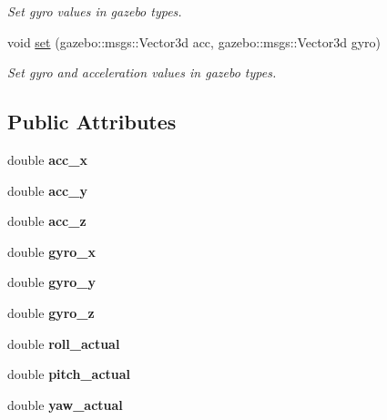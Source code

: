 \begin{DoxyCompactItemize}
\begin{DoxyCompactList}\small\item\em \-Set gyro values in gazebo types. \end{DoxyCompactList}\item 
\hypertarget{classIMU_a72be203017649a73245e1825bb0fa6a3}{void \hyperlink{classIMU_a72be203017649a73245e1825bb0fa6a3}{set} (gazebo\-::msgs\-::\-Vector3d acc, gazebo\-::msgs\-::\-Vector3d gyro)}\label{classIMU_a72be203017649a73245e1825bb0fa6a3}

\begin{DoxyCompactList}\small\item\em \-Set gyro and acceleration values in gazebo types. \end{DoxyCompactList}\end{DoxyCompactItemize}
\subsection*{\-Public \-Attributes}
\begin{DoxyCompactItemize}
\item 
\hypertarget{classIMU_a16bd4062efbff3e6e07f81491bdc3dc1}{double {\bfseries acc\-\_\-x}}\label{classIMU_a16bd4062efbff3e6e07f81491bdc3dc1}

\item 
\hypertarget{classIMU_aa5bde37d857dec28fcbe7544af9ec3e9}{double {\bfseries acc\-\_\-y}}\label{classIMU_aa5bde37d857dec28fcbe7544af9ec3e9}

\item 
\hypertarget{classIMU_a47bb386e4b6acc5600b3c03d0d130960}{double {\bfseries acc\-\_\-z}}\label{classIMU_a47bb386e4b6acc5600b3c03d0d130960}

\item 
\hypertarget{classIMU_a0a3f4e8e47e1047ec96fa558b83eb567}{double {\bfseries gyro\-\_\-x}}\label{classIMU_a0a3f4e8e47e1047ec96fa558b83eb567}

\item 
\hypertarget{classIMU_a40c3a9e20d6aa8c72df86a5bb3592060}{double {\bfseries gyro\-\_\-y}}\label{classIMU_a40c3a9e20d6aa8c72df86a5bb3592060}

\item 
\hypertarget{classIMU_a9bb72ce07f2318bbb93603c9fa2729fd}{double {\bfseries gyro\-\_\-z}}\label{classIMU_a9bb72ce07f2318bbb93603c9fa2729fd}

\item 
\hypertarget{classIMU_a515105cde25acc79d21ac892489a0f9e}{double {\bfseries roll\-\_\-actual}}\label{classIMU_a515105cde25acc79d21ac892489a0f9e}

\item 
\hypertarget{classIMU_aaf572063b0d77b64e112f031a4bd0897}{double {\bfseries pitch\-\_\-actual}}\label{classIMU_aaf572063b0d77b64e112f031a4bd0897}

\item 
\hypertarget{classIMU_a6d85a90119da57e3ffe317e03e8f5b3c}{double {\bfseries yaw\-\_\-actual}}\label{classIMU_a6d85a90119da57e3ffe317e03e8f5b3c}

\end{DoxyCompactItemize}
